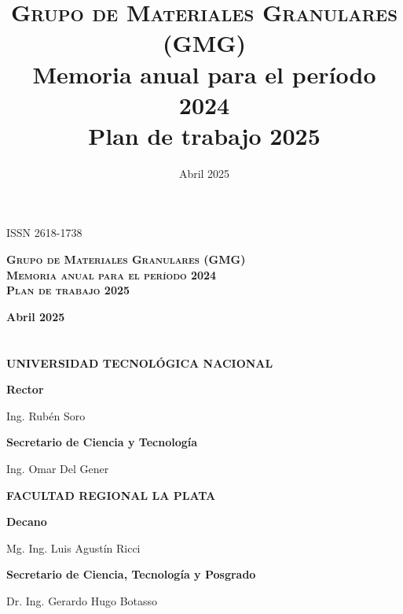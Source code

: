 \documentclass[a4paper,11pt,twoside,final,titlepage,onecolumn,openright]{report}
\begin{document}
\title{\textsc{Grupo de Materiales Granulares (GMG)}\\
Memoria anual para el período 2024 \\
Plan de trabajo 2025}
\date{Abril 2025}


\chapter*{}

\begin{flushright}
 ISSN 2618-1738
\end{flushright}

\vspace{5cm}
\begin{center}

\textbf{\LARGE \textsc{Grupo de Materiales Granulares (GMG)} \\[1em] \textsc{Memoria anual para el período 2024} \\[1em] \textsc{Plan de trabajo 2025}}

\vspace{1cm}
\textbf{\Large Abril 2025}
\end{center}


\chapter*{}

\begin{center}

\textbf{\LARGE UNIVERSIDAD TECNOLÓGICA NACIONAL} 

\vspace{1cm}
\textbf{\Large Rector}

Ing. Rubén Soro

\vspace{0.5cm}
\textbf{\Large Secretario de Ciencia y Tecnología} 

Ing. Omar Del Gener

\vspace{5cm}

\textbf{\LARGE FACULTAD REGIONAL LA PLATA} 

\vspace{1cm}
\textbf{\Large Decano} 

Mg. Ing. Luis Agustín Ricci

\vspace{0.5cm}
\textbf{\Large Secretario de Ciencia, Tecnología y Posgrado}

Dr. Ing. Gerardo Hugo Botasso
 
\end{center}
\end{document}

